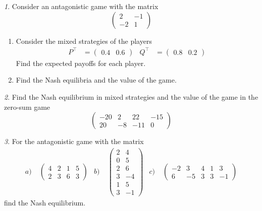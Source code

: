 \documentclass[12pt]{article}
\theoremstyle{remark}
\newtheorem{exercise}{}[subsection]
\begin{document}
\begin{exercise}
Consider an antagonistic game with the matrix
\[
	\begin{pmatrix}
	2 & -1 \\ -2 & 1
	\end{pmatrix}
\]
\begin{enumerate}
	\item Consider the mixed strategies of the players
	\begin{align*}
		P^\top&=\begin{pmatrix} 0.4 & 0.6 \end{pmatrix} &
		Q^\top&=\begin{pmatrix} 0.8 & 0.2 \end{pmatrix}
	\end{align*}
	Find the expected payoffs for each player.
	\item Find the Nash equilibria and the value of the game.
\end{enumerate}
\end{exercise}

\begin{exercise}
Find the Nash equilibrium in mixed strategies and the value of the game in
the zero-sum game
\[
	\begin{pmatrix}
	-20 & 2 & 22 & -15 \\ 20 & -8 & -11 & 0
    \end{pmatrix}
\]
\end{exercise}

\begin{exercise}
For the antagonistic game with the matrix
\begin{align*}
	a)&\;\begin{pmatrix} 4 & 2 & 1 & 5 \\ 2 & 3 & 6 & 3 \end{pmatrix} &
	b)&\; \begin{pmatrix} 2 & 4 \\ 0 & 5 \\ 2 & 6 \\ 3 & -4 \\ 1 & 5 \\ 3 & -1\end{pmatrix} &
	c)&\; \begin{pmatrix} -2 & 3 & 4 & 1 & 3 \\ 6 & -5 & 3 & 3 & -1 \end{pmatrix}
\end{align*}
find the Nash equilibrium.
\end{exercise}
\end{document}
